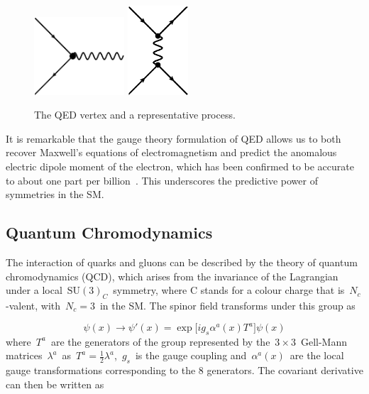 \begin{figure}
\begin{centering}
\includegraphics[width=0.3\textwidth]{figures/theory/qed_vertex.eps}
\includegraphics[width=0.2\textwidth]{figures/theory/qed_process.eps}
\caption{The QED vertex and a representative process.}
\label{fig:theory_qed}
\end{centering}
\end{figure}

It is remarkable that the gauge theory formulation of QED allows us to both recover Maxwell's equations of electromagnetism and predict the anomalous electric dipole moment of the electron, which has been confirmed to be accurate to about one part per billion~\cite{Aoyama:2007mn}. This underscores the predictive power of symmetries in the SM.

\subsection{Quantum Chromodynamics}
\label{sec:theory_qcd}
The interaction of quarks and gluons can be described by the theory of quantum chromodynamics (QCD), which arises from the invariance of the Lagrangian under a local~$\mathrm{SU}(3)_C$~symmetry, where C stands for a colour charge that is~$N_c$-valent, with~$N_c = 3$~in the SM. The spinor field transforms under this group as

\begin{equation}
\psi(x) \rightarrow \psi'(x) = \exp \bigl[ i g_s \alpha^a(x) T^a \bigr] \psi(x)
\end{equation}
where~$T^a$~are the generators of the group represented by the~$3\times3$~Gell-Mann matrices~$\lambda^a$~as~$T^a = \frac{1}{2} \lambda^a$,~$g_s$~is the gauge coupling and~$\alpha^a(x)$~are the local gauge transformations corresponding to the 8 generators. The covariant derivative can then be written as


